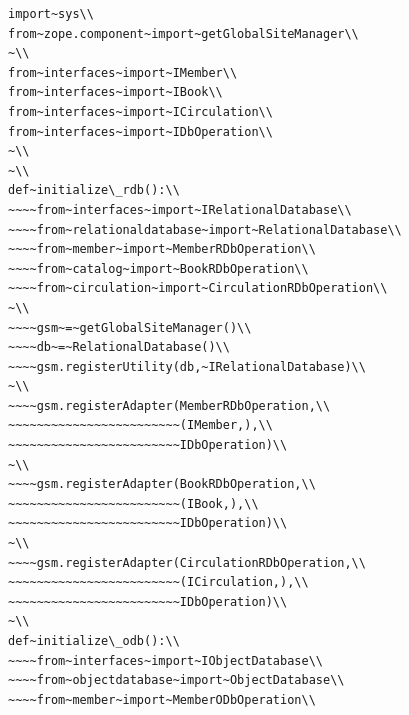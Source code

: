 \documentclass[a4paper,openany,twoside,draft]{book}
\begin{document}
\begin{verbatim}
import~sys\\
from~zope.component~import~getGlobalSiteManager\\
~\\
from~interfaces~import~IMember\\
from~interfaces~import~IBook\\
from~interfaces~import~ICirculation\\
from~interfaces~import~IDbOperation\\
~\\
~\\
def~initialize\_rdb():\\
~~~~from~interfaces~import~IRelationalDatabase\\
~~~~from~relationaldatabase~import~RelationalDatabase\\
~~~~from~member~import~MemberRDbOperation\\
~~~~from~catalog~import~BookRDbOperation\\
~~~~from~circulation~import~CirculationRDbOperation\\
~\\
~~~~gsm~=~getGlobalSiteManager()\\
~~~~db~=~RelationalDatabase()\\
~~~~gsm.registerUtility(db,~IRelationalDatabase)\\
~\\
~~~~gsm.registerAdapter(MemberRDbOperation,\\
~~~~~~~~~~~~~~~~~~~~~~~~(IMember,),\\
~~~~~~~~~~~~~~~~~~~~~~~~IDbOperation)\\
~\\
~~~~gsm.registerAdapter(BookRDbOperation,\\
~~~~~~~~~~~~~~~~~~~~~~~~(IBook,),\\
~~~~~~~~~~~~~~~~~~~~~~~~IDbOperation)\\
~\\
~~~~gsm.registerAdapter(CirculationRDbOperation,\\
~~~~~~~~~~~~~~~~~~~~~~~~(ICirculation,),\\
~~~~~~~~~~~~~~~~~~~~~~~~IDbOperation)\\
~\\
def~initialize\_odb():\\
~~~~from~interfaces~import~IObjectDatabase\\
~~~~from~objectdatabase~import~ObjectDatabase\\
~~~~from~member~import~MemberODbOperation\\

\end{verbatim}
\end{document}
